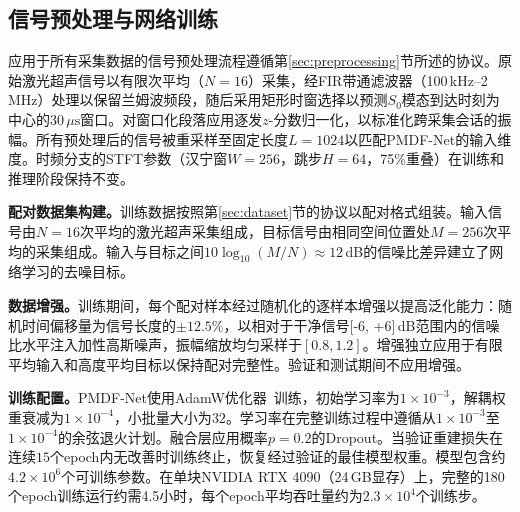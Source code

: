 \subsection{信号预处理与网络训练}
\label{sec:experiment-training}

应用于所有采集数据的信号预处理流程遵循第\ref{sec:preprocessing}节所述的协议。原始激光超声信号以有限次平均（$N = 16$）采集，经FIR带通滤波器（100\,kHz--2\,MHz）处理以保留兰姆波频段，随后采用矩形时窗选择以预测$S_0$模态到达时刻为中心的$30\,\mu\text{s}$窗口。对窗口化段落应用逐发$z$-分数归一化，以标准化跨采集会话的振幅。所有预处理后的信号被重采样至固定长度$L = 1024$以匹配PMDF-Net的输入维度。时频分支的STFT参数（汉宁窗$W = 256$，跳步$H = 64$，75\%重叠）在训练和推理阶段保持不变。

\textbf{配对数据集构建。}训练数据按照第\ref{sec:dataset}节的协议以配对格式组装。输入信号由$N = 16$次平均的激光超声采集组成，目标信号由相同空间位置处$M = 256$次平均的采集组成。输入与目标之间$10\log_{10}(M/N) \approx 12$\,dB的信噪比差异建立了网络学习的去噪目标。

\textbf{数据增强。}训练期间，每个配对样本经过随机化的逐样本增强以提高泛化能力：随机时间偏移量为信号长度的$\pm 12.5\%$，以相对于干净信号[-6, +6]\,dB范围内的信噪比水平注入加性高斯噪声，振幅缩放均匀采样于$[0.8, 1.2]$。增强独立应用于有限平均输入和高度平均目标以保持配对完整性。验证和测试期间不应用增强。

\textbf{训练配置。}PMDF-Net使用AdamW优化器~\cite{Loshchilov2019}训练，初始学习率为$1 \times 10^{-3}$，解耦权重衰减为$1 \times 10^{-4}$，小批量大小为$32$。学习率在完整训练过程中遵循从$1 \times 10^{-3}$至$1 \times 10^{-4}$的余弦退火计划。融合层应用概率$p = 0.2$的Dropout。当验证重建损失在连续$15$个epoch内无改善时训练终止，恢复经过验证的最佳模型权重。模型包含约$4.2 \times 10^6$个可训练参数。在单块NVIDIA RTX 4090（24\,GB显存）上，完整的180个epoch训练运行约需4.5小时，每个epoch平均吞吐量约为$2.3 \times 10^4$个训练步。